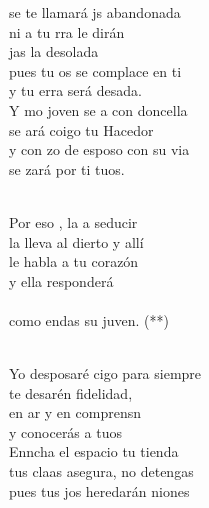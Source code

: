 \documentclass[12pt]{article}
\begin{document}
\begin{multicols*}{2}
\begin{cancion}%
	 se te llamará js abandonada \\
	ni a tu rra le dirán \\
	jas la desolada \\
	pues tu os se complace en ti \\
	y tu erra será desada.\\
\jump
	Y mo joven se a con doncella\\
	se ará coigo tu Hacedor\\
	y con zo de esposo con su via\\
	se zará por ti tuos. \\\jump\\
	\begin{chorus}%
	Por eso , la  a seducir\\
	la lleva al dierto y allí\\
	le habla a tu corazón \\
	y ella  responderá\\
{}\vspace*{-0.4cm}\\
	como endas su juven. (**)\\
	\end{chorus}%
	\jump\\
	Yo  desposaré cigo para siempre\\
	te desarén fidelidad,\\
	en ar y en comprensn \\
	y  conocerás a tuos\\
\jump
	Enncha el espacio tu tienda\\
	tus claas asegura, no  detengas\\
	pues tus jos heredarán niones\\

\end{cancion}
\end{multicols*}
\end{document}

